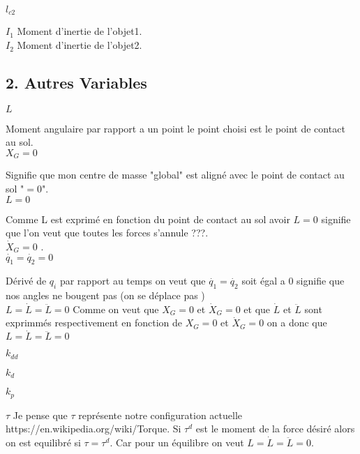 \documentclass[a4paper,12pt]{report}
\begin{document}
$	l_{c2} $


$	I_{1} $
Moment d'inertie de l'objet1.\\


$	I_{2} $
Moment d'inertie de l'objet2.\\



\subsection*{2. Autres Variables}
\label{sub:Autres Variables}


$	L $

Moment angulaire par rapport a un point le point choisi est le point de contact au sol.\\


$	X_{G} = 0 $

Signifie que mon centre de masse "global" est aligné avec le point de contact au sol "$=0$".\\


$	L = 0 $

Comme L est exprimé en fonction du point de contact au sol avoir $	L = 0 $ signifie que l'on veut que toutes les forces s'annule ???.\\


$	\dot{X}_{G} = 0 $
.\\


$	\dot{q_{1}} = \dot{q_{2}} = 0 $

Dérivé de $q_{i}$ par rapport au temps on veut que $	\dot{q_{1}} = \dot{q_{2}} $ soit égal a $0$ signifie que nos angles ne bougent pas (on se déplace pas )\\



$	L = \dot{L} = \ddot{L} = 0 $
Comme on veut que $	X_{G} = 0 $ et  $	\dot{X}_{G} = 0 $ et que $ \dot{L}$ et $\ddot{L}$ sont exprimmés respectivement en fonction de $	X_{G} = 0 $ et  $	\dot{X}_{G} = 0 $ on a donc que $	L = \dot{L} = \ddot{L} = 0 $



$	k_{dd} $

$	k_{d} $

$	k_{p} $

$	\tau $
Je pense que $\tau$ représente notre configuration actuelle https://en.wikipedia.org/wiki/Torque.
Si $\tau^{d}$ est le moment de la force désiré alors on est equilibré si $\tau = \tau^{d}$. Car pour un équilibre on veut $	L = \dot{L} = \ddot{L} = 0 $.\\
\end{document}
